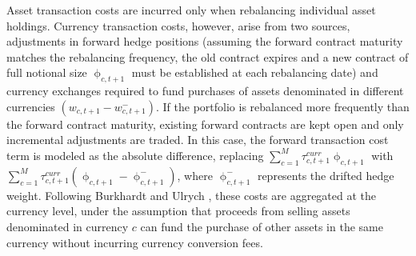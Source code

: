 Asset transaction costs are incurred only when rebalancing individual asset holdings. Currency 
transaction costs, however, arise from two sources, adjustments in forward hedge positions 
(assuming the forward contract maturity matches the rebalancing frequency, 
the old contract expires and a new contract of full notional size $\upphi_{c,t+1}$ 
must be established at each rebalancing date) and currency exchanges required to fund 
purchases of assets denominated in different currencies $(w_{c,t+1} - w^{-}_{c,t+1})$. 
If the portfolio is rebalanced more frequently than the forward contract maturity, 
existing forward contracts are kept open and only incremental adjustments are traded. 
In this case, the forward transaction cost term is modeled as the absolute difference, 
replacing $\sum_{c=1}^{M} \tau^{curr}_{c,t+1} \upphi_{c,t+1}$ with $\sum_{c=1}^{M} \tau^{curr}_{c,t+1} (\upphi_{c,t+1} - \upphi^{-}_{c,t+1})$, where $\upphi^{-}_{c,t+1}$ 
represents the drifted hedge weight. Following Burkhardt and Ulrych \cite{SparseAndStableInternationalPortfolioOptimization}, 
these costs are aggregated at the currency level, under the assumption that proceeds from selling assets 
denominated in currency $c$ can fund the purchase of other assets in the same currency without incurring currency 
conversion fees.

